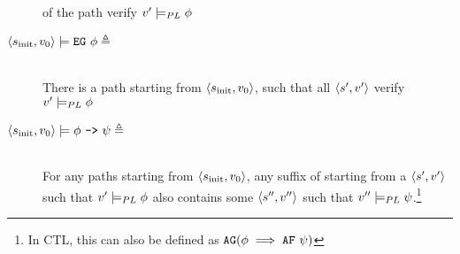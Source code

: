 \begin{description}
         of the path
         verify
         $
         v_{}'
         \models_{PL} \phi
         $
\item[%
   $
      \langle
         s_{\text{init}}{},
         v_{0}
      \rangle{}
      \models
      \text{\texttt{EG}}{}{}~\phi \triangleq
   $]~~\\
      There is a path starting from
         $\langle
            s_{\text{init}}{},
            v_{0}
         \rangle$, such that all 
         $\langle
            s_{}',
            v_{}'
         \rangle$
         verify
         $
         v_{}'
         \models_{PL} \phi
         $
\item[%
   $
      \langle
         s_{\text{init}}{},
         v_{0}
      \rangle{}
      \models
      \phi~\texttt{-->}~\psi \triangleq
   $]~~\\
      For any paths \pi starting from
         $\langle
            s_{\text{init}}{},
            v_{0}
         \rangle$,
         any suffix of \pi starting from a
         $\langle
            s_{}',
            v_{}'
         \rangle$
         such that
         $
         v_{}'
         \models_{PL} \phi
         $
         also contains some
         $\langle
            s_{}'',
            v_{}''
         \rangle$
         such that
         $
         v_{}''
         \models_{PL} \psi
         $.\footnote{In CTL, this can also be defined as $\text{\texttt{AG}}{}{}(\phi \implies
         \text{\texttt{AF}}{}{}~\psi)$}
\end{description}
\fi
